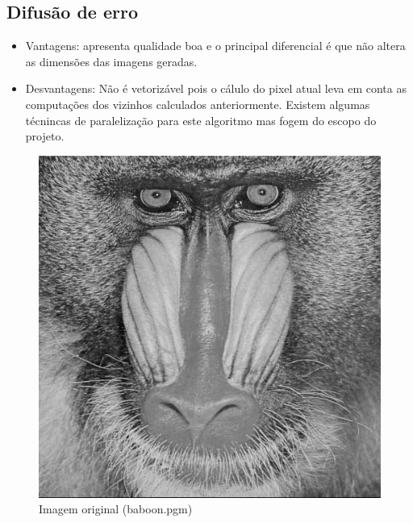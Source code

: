 \documentclass{article}
\begin{document}
\subsection{Difusão de erro}

\begin{itemize}
    \item Vantagens: apresenta qualidade boa e o principal diferencial é que não altera as dimensões das imagens geradas.

    \item Desvantagens: Não é vetorizável pois o cálulo do pixel atual leva em conta as computações dos vizinhos calculados anteriormente. Existem algumas técnincas de paralelização para este algoritmo mas fogem do escopo do projeto. 
\end{itemize}


\begin{figure}[!htb]
    \begin{minipage}{0.48\textwidth}
      \centering
      \includegraphics[width=.99\linewidth]{baboon.png}
      \caption{Imagem original (baboon.pgm)}\label{Fig:baboon1}
    \end{minipage}\hfill
    \begin{minipage}{0.48\textwidth}
      \centering

\end{minipage}
\end{figure}
\end{document}
